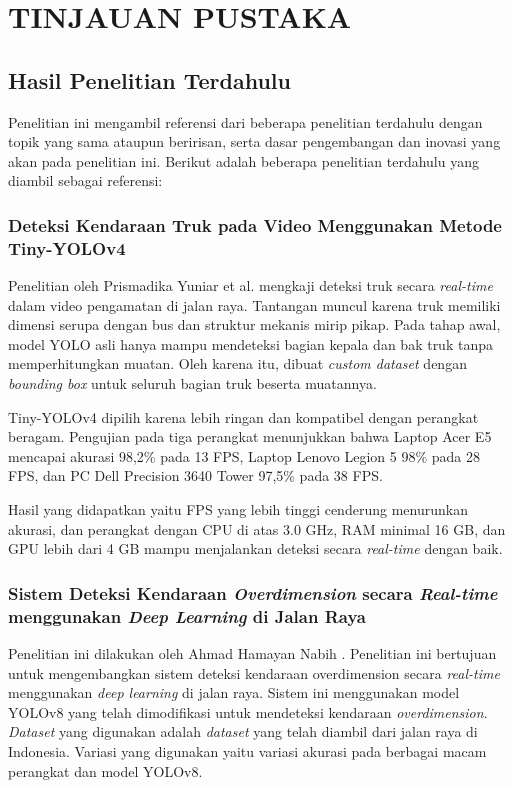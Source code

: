 \chapter{TINJAUAN PUSTAKA}
\label{chap:tinjauanpustaka}


\section{Hasil Penelitian Terdahulu}
\label{sec:hasilpenelitianterdahulu}
Penelitian ini mengambil referensi dari beberapa penelitian terdahulu dengan topik yang sama ataupun beririsan, serta dasar pengembangan dan inovasi yang akan pada penelitian ini. Berikut adalah beberapa penelitian terdahulu yang diambil sebagai referensi:

\subsection{Deteksi Kendaraan Truk pada Video Menggunakan Metode Tiny-YOLOv4}
\label{subsec:deteksikendaraantrukprismadika}
Penelitian oleh Prismadika Yuniar et al. \parencite*{prismadika2023} mengkaji deteksi truk secara \emph{real-time} dalam video pengamatan di jalan raya. Tantangan muncul karena truk memiliki dimensi serupa dengan bus dan struktur mekanis mirip pikap. Pada tahap awal, model YOLO asli hanya mampu mendeteksi bagian kepala dan bak truk tanpa memperhitungkan muatan. Oleh karena itu, dibuat \emph{custom dataset} dengan \emph{bounding box} untuk seluruh bagian truk beserta muatannya.

Tiny-YOLOv4 dipilih karena lebih ringan dan kompatibel dengan perangkat beragam. Pengujian pada tiga perangkat menunjukkan bahwa Laptop Acer E5 mencapai akurasi 98,2\% pada 13 FPS, Laptop Lenovo Legion 5 98\% pada 28 FPS, dan PC Dell Precision 3640 Tower 97,5\% pada 38 FPS. 

Hasil yang didapatkan yaitu FPS yang lebih tinggi cenderung menurunkan akurasi, dan perangkat dengan CPU di atas 3.0 GHz, RAM minimal 16 GB, dan GPU lebih dari 4 GB mampu menjalankan deteksi secara \emph{real-time} dengan baik.

\subsection{Sistem Deteksi Kendaraan \emph{Overdimension} secara \emph{Real-time} menggunakan \emph{Deep Learning} di Jalan Raya}
\label{subsec:deteksikendaraanoverdimensionhamayan}
Penelitian ini dilakukan oleh Ahmad Hamayan Nabih \parencite*{hamayan2024}. Penelitian ini bertujuan untuk mengembangkan sistem deteksi kendaraan overdimension secara \emph{real-time} menggunakan \emph{deep learning} di jalan raya. Sistem ini menggunakan model YOLOv8 yang telah dimodifikasi untuk mendeteksi kendaraan \emph{overdimension}. \emph{Dataset} yang digunakan adalah \emph{dataset} yang telah diambil dari jalan raya di Indonesia. Variasi yang digunakan yaitu variasi akurasi pada berbagai macam perangkat dan model YOLOv8.

